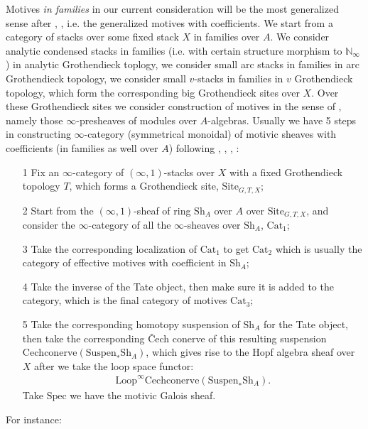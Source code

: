 \documentclass[12pt]{article}
\theoremstyle{definition}
\begin{document}
Motives \textit{in families} in our current consideration will be the most generalized sense after \cite{3S}, \cite{3A}, i.e. the generalized motives with coefficients. We start from a category of stacks over some fixed stack $X$ in families over $A$. We consider analytic condensed stacks in families (i.e. with certain structure morphism to $\mathbb{N}_\infty$) in analytic Grothendieck toplogy, we consider small arc stacks in families in arc Grothendieck topology, we consider small $v$-stacks in families in $v$ Grothendieck topology, which form the corresponding big Grothendieck sites over $X$. Over these Grothendieck sites we consider construction of motives in the sense of \cite{3S}, \cite{3A} namely those $\infty$-presheaves of modules over $A$-algebras. Usually we have 5 steps in constructing $\infty$-category (symmetrical monoidal) of motivic sheaves with coefficients (in families as well over $A$) following \cite{3G}, \cite{3V}, \cite{3A}, \cite{3S}:
\begin{itemize}
\item[1] Fix an $\infty$-category of $(\infty,1)$-stacks over $X$ with a fixed Grothendieck topology $T$, which forms a Grothendieck site, $\mathrm{Site}_{G,T,X}$;
\item[2] Start from the $(\infty,1)$-sheaf of ring $\mathrm{Sh}_A$ over $A$ over $\mathrm{Site}_{G,T,X}$, and consider the $\infty$-category of all the $\infty$-sheaves over $\mathrm{Sh}_A$, $\mathrm{Cat}_1$;
\item[3] Take the corresponding localization of $\mathrm{Cat}_1$ to get $\mathrm{Cat}_2$ which is usually the category of effective motives with coefficient in $\mathrm{Sh}_A$;
\item[4] Take the inverse of the Tate object, then make sure it is added to the category, which is the final category of motives $\mathrm{Cat}_3$;
\item[5] Take the corresponding homotopy suspension of $\mathrm{Sh}_A$ for the Tate object, then take the corresponding \v{C}ech conerve of this resulting suspension $\mathrm{Cechconerve}(\mathrm{Suspen}_*\mathrm{Sh}_A)$, which gives rise to the Hopf algebra sheaf over $X$ after we take the loop space functor:
\begin{align}
\mathrm{Loop}^\infty\mathrm{{Cechconerve}}(\mathrm{Suspen}_*\mathrm{Sh}_A).
\end{align} 
Take $\mathrm{Spec}$ we have the motivic Galois sheaf.
\end{itemize}
For instance:
\end{document}
